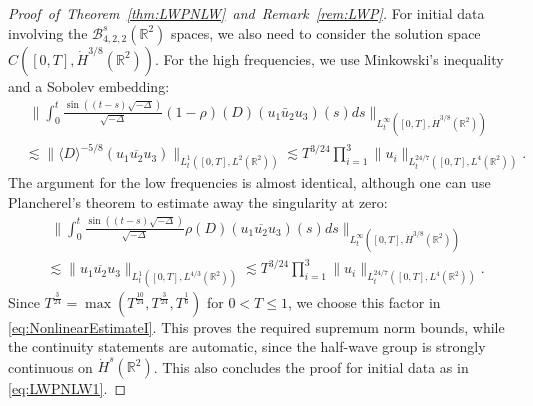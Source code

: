 \documentclass{amsart}
\theoremstyle{definition}
\newcommand {\Rtwo}{\mathbb{R}^{2}}
\newcommand {\Ba}{\mathcal{B}}
\numberwithin{equation}{section}
\begin{document}
\begin{proof}[Proof~of~Theorem~\ref{thm:LWPNLW}~and~Remark~\ref{rem:LWP}]
For initial data involving the $\Ba^{s}_{4,2,2}(\Rtwo)$ spaces, we also need to consider the solution space $C([0,T],\dot{H}^{3/8}(\Rtwo))$. For the high frequencies, we use Minkowski's inequality and a Sobolev embedding:
\begin{equation*}
\begin{split}
&\; \Big\| \int_0^t \frac{\sin((t-s) \sqrt{-\Delta})}{\sqrt{-\Delta}} (1-\rho)(D) (u_1 \bar{u}_2 u_3)(s) ds \Big\|_{L^{\infty}_{t}([0,T],\dot{H}^{3/8}(\Rtwo))} \\
&\lesssim \| \langle D \rangle^{-5/8} (u_1 \overline{u_2} u_3) \|_{L_t^1([0,T], L^{2}(\Rtwo))} \lesssim T^{3/24} \prod_{i=1}^{3}\| u_i \|_{L_t^{24/7}([0,T], L^4(\Rtwo))}.
\end{split}
\end{equation*}
The argument for the low frequencies is almost identical, although one can use Plancherel's theorem to estimate away the singularity at zero:
\begin{equation*}
\begin{split}
&\; \Big\| \int_0^t \frac{\sin((t-s) \sqrt{-\Delta})}{\sqrt{-\Delta}} \rho(D) (u_1 \overline{u_2} u_3)(s) ds \Big\|_{L^{\infty}_{t}([0,T],\dot{H}^{3/8}(\Rtwo))} \\
&\lesssim \| u_1 \overline{u_2} u_3 \|_{L_t^1([0,T], L^{4/3}(\Rtwo))} \lesssim T^{3/24} \prod_{i=1}^3 \| u_i \|_{L_t^{24/7}([0,T], L^4(\Rtwo))}.
\end{split}
\end{equation*}
Since $T^{\frac{3}{24}} = \max( T^{\frac{10}{24}}, T^{\frac{3}{24}}, T^{\frac{1}{6}})$ for $0 < T \leq 1$, we choose this factor in \eqref{eq:NonlinearEstimateI}.
This proves the required supremum norm bounds, while the continuity statements are automatic, since the half-wave group is strongly continuous on $\dot{H}^{s}(\Rtwo)$. This also concludes the proof for initial data as in \eqref{eq:LWPNLW1}.


\end{proof}
\end{document}
